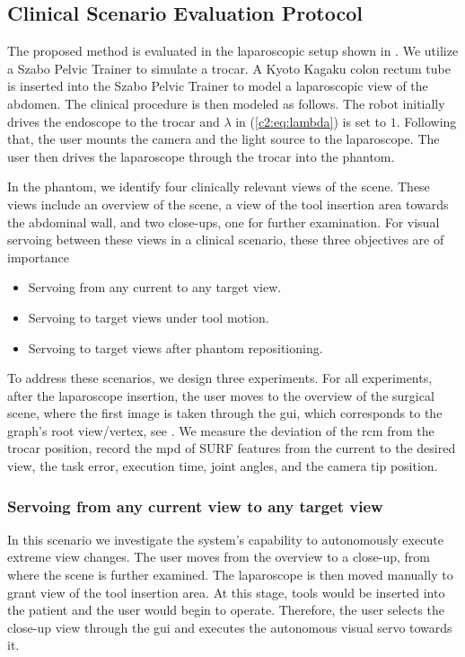 
\subsection{Clinical Scenario Evaluation Protocol}
\label{c2:sec:clin_protocol}

The proposed method is evaluated in the laparoscopic setup shown in . We utilize a Szabo Pelvic Trainer to simulate a trocar. A Kyoto Kagaku colon rectum tube is inserted into the Szabo Pelvic Trainer to model a laparoscopic view of the abdomen. The clinical procedure is then modeled as follows. The robot initially drives the endoscope to the trocar and $\lambda$ in (\eqref{c2:eq:lambda}) is set to $1$. Following that, the user mounts the camera and the light source to the laparoscope. The user then drives the laparoscope through the trocar into the phantom.

In the phantom, we identify four clinically relevant views of the scene. These views include an overview of the scene, a view of the tool insertion area towards the abdominal wall, and two close-ups, one for further examination. For visual servoing between these views in a clinical scenario, these three objectives are of importance

\begin{itemize}
    \item Servoing from any current to any target view.
    \item Servoing to target views under tool motion.
    \item Servoing to target views after phantom repositioning.
\end{itemize}

To address these scenarios, we design three experiments. For all experiments, after the laparoscope insertion, the user moves to the overview of the surgical scene, where the first image is taken through the \acrshort{gui}, which corresponds to the graph's root view/vertex, see . We measure the deviation of the \acrshort{rcm} from the trocar position, record the \acrfull{mpd} of SURF features from the current to the desired view, the task error, execution time, joint angles, and the camera tip position.

\subsubsection{Servoing from any current view to any target view}
\label{c2:sec:clin_protocol_any}
In this scenario we investigate the system's capability to autonomously execute extreme view changes. The user moves from the overview to a close-up, from where the scene is further examined. The laparoscope is then moved manually to grant view of the tool insertion area. At this stage, tools would be inserted into the patient and the user would begin to operate. Therefore, the user selects the close-up view through the \acrshort{gui} and executes the autonomous visual servo towards it.

